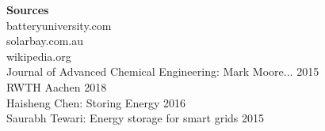 \documentclass[12pt,a4paper]{article}
\begin{document}
\textbf{Sources} \\batteryuniversity.com\\
solarbay.com.au\\
wikipedia.org\\
Journal of Advanced Chemical Engineering: Mark Moore... 2015\\
RWTH Aachen 2018\\
Haisheng Chen: Storing Energy 2016\\
Saurabh Tewari: Energy storage for smart grids 2015\\
\end{document}
